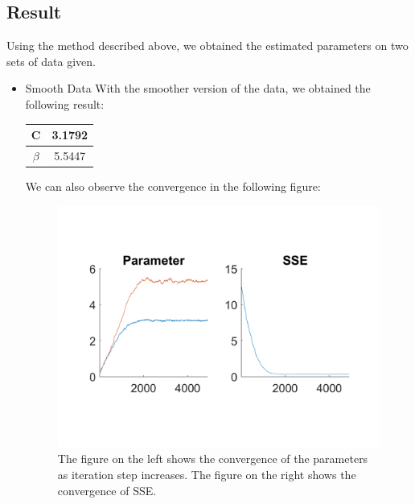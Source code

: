 \documentclass{article}
\begin{document}
\subsection{Result}
Using the method described above, we obtained the estimated parameters on two sets of data given.
\begin{itemize}
\item Smooth Data
With the smoother version of the data, we obtained the following result:
\begin{center}
\begin{tabular}{|cc|}
\hline
C & 3.1792\\
\hline
$\beta$ & 5.5447\\
\hline
\end{tabular}
\end{center}
\pagebreak
We can also observe the convergence in the following figure:
\begin{figure}[H]
\centering
\includegraphics[scale=0.3]{figures/p_a_conv.png}
\caption{The figure on the left shows the convergence of the parameters as iteration step increases. The figure on the right shows the convergence of SSE.}
\end{figure}


\end{itemize}
\end{document}
